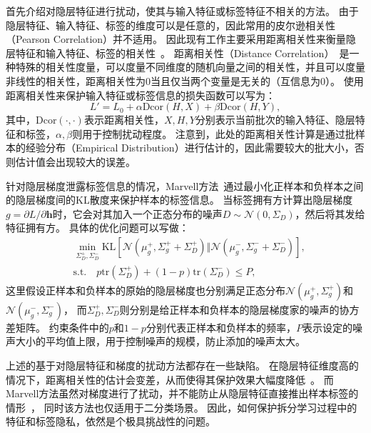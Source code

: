 首先介绍对隐层特征进行扰动，使其与输入特征或标签特征不相关的方法。
%
由于隐层特征、输入特征、标签的维度可以是任意的，因此常用的皮尔逊相关性（Pearson Correlation）并不适用。
%
因此现有工作主要采用距离相关性来衡量隐层特征和输入特征、标签的相关性~\cite{vepakomma2020nopeek,sunjiankai2022forward_embedding_protect}。
%
距离相关性（Distance Correlation）~\cite{szekely2007dcor,szekely2009brownian_dcor}是一种特殊的相关性度量，可以度量不同维度的随机向量之间的相关性，并且可以度量非线性的相关性，距离相关性为0当且仅当两个变量是无关的（互信息为0）。
%
使用距离相关性来保护输入特征或标签信息的损失函数可以写为：
\begin{equation}
    L' = L_0 + \alpha \text{Dcor}(H, X) + \beta \text{Dcor}(H, Y),
\end{equation}
其中，$\text{Dcor}(\cdot, \cdot)$表示距离相关性，$X,H,Y$分别表示当前批次的输入特征、隐层特征和标签，$\alpha,\beta$则用于控制扰动程度。
%
注意到，此处的距离相关性计算是通过批样本的经验分布（Empirical Distribution）进行估计的，因此需要较大的批大小，否则估计值会出现较大的误差。
%

针对隐层梯度泄露标签信息的情况，Marvell方法~\cite{oscarli2022label_defense_marvell}通过最小化正样本和负样本之间的隐层梯度间的KL散度来保护样本的标签信息。
%
当标签拥有方计算出隐层梯度$g = \partial L/\partial \mathbf h$时，它会对其加入一个正态分布的噪声$D \sim \mathcal N(0, \Sigma_D)$，然后将其发给特征拥有方。
%
具体的优化问题可以写做：
\begin{equation}
\begin{split}
\label{eq:related_work:marvell}
    & \min_{\Sigma_D^+,\Sigma_D^-} \text{KL}\left[\mathcal N(\mu_g^+, \Sigma_g^+ + \Sigma_D^+)\Vert\mathcal N(\mu_g^-, \Sigma_g^- + \Sigma_D^-)\right],
    \\
    & \text{s.t.}\quad p\text{tr}(\Sigma_D^+) + (1-p)\text{tr}(\Sigma_D^-) \le P,
\end{split}
\end{equation}
这里假设正样本和负样本的原始的隐层梯度也分别满足正态分布$\mathcal N(\mu_g^+, \Sigma_g^+)$和$\mathcal N(\mu_g^-, \Sigma_g^-)$，
而$\Sigma_D^+,\Sigma_D^-$则分别是给正样本和负样本的隐层梯度家的噪声的协方差矩阵。
%
约束条件中的$p$和$1-p$分别代表正样本和负样本的频率，$P$表示设定的噪声大小的平均值上限，用于控制噪声的规模，防止添加的噪声太大。
%


上述的基于对隐层特征和梯度的扰动方法都存在一些缺陷。
%
在隐层特征维度高的情况下，距离相关性的估计会变差，从而使得其保护效果大幅度降低~\cite{erdogan2022unsplit}。
%
而Marvell方法虽然对梯度进行了扰动，并不能防止从隐层特征直接推出样本标签的情形~\cite{sunjiankai2022forward_embedding_protect}，
同时该方法也仅适用于二分类场景。
%
因此，如何保护拆分学习过程中的特征和标签隐私，依然是个极具挑战性的问题。


